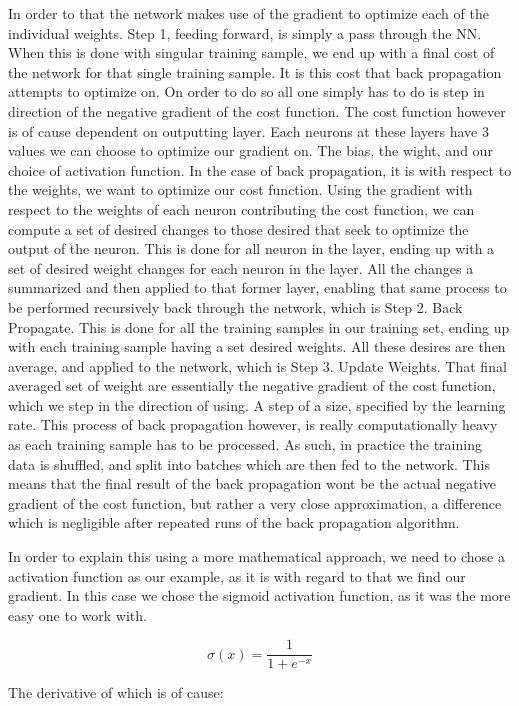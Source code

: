 In order to that the network makes use of the gradient to optimize each of
the individual weights. Step 1, feeding forward, is simply a pass through the
\gls{NN}. When this is done with singular training sample, we end up with a
final cost of the network for that single training sample. It is this cost that
back propagation attempts to optimize on. On order to do so all one simply
has to do is step in direction of the negative gradient of the cost function.
The cost function however is of cause dependent on outputting layer. Each
neurons at these layers have 3 values we can choose to optimize our gradient
on. The bias, the wight, and our choice of activation function. In the case of
back propagation, it is with respect to the weights, we want to optimize our
cost function. Using the gradient with respect to the weights of each neuron
contributing the cost function, we can compute a set of desired changes to
those desired that seek to optimize the output of the neuron. This is done
for all neuron in the layer, ending up with a set of desired weight changes
for each neuron in the layer. All the changes a summarized and then applied
to that former layer, enabling that same process to be performed recursively
back through the network, which is Step 2. Back Propagate. This is done for all
the training samples in our training set, ending up with each training sample
having a set desired weights. All these desires are then average, and applied
to the network, which is Step 3. Update Weights. That final averaged set of
weight are essentially the negative gradient of the cost function, which we
step in the direction of using. A step of a size, specified by the learning
rate. This process of back propagation however, is really computationally heavy
as each training sample has to be processed. As such, in practice the training
data is shuffled, and split into batches which are then fed to the network.
This means that the final result of the back propagation wont be the actual
negative gradient of the cost function, but rather a very close approximation,
a difference which is negligible after repeated runs of the back propagation
algorithm.

In order to explain this using a more mathematical approach, we need to chose
a activation function as our example, as it is with regard to that we find our
gradient. In this case we chose the sigmoid activation function, as it was
the more easy one to work with.

$$
\sigma(x) = \frac{1}{1 + e^{-x}}
$$

The derivative of which is of cause:

